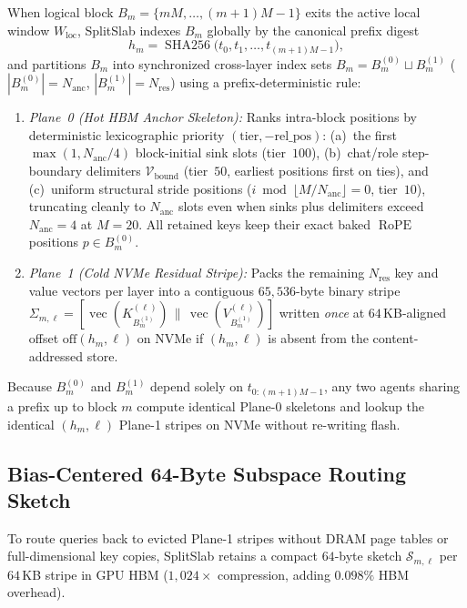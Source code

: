 \documentclass[final,5p,times,twocolumn]{elsarticle}
\theoremstyle{definition}
\theoremstyle{remark}
\newcommand{\SplitSlab}{\textup{\textsc{SplitSlab}}}
\newcommand{\RoPE}{\operatorname{RoPE}}
\def\SplitSlab{SplitSlab}%
\begin{document}
When logical block $B_m = \{mM, \dots, (m+1)M - 1\}$ exits the active local window $W_{\mathrm{loc}}$, \SplitSlab{} indexes $B_m$ globally by the canonical prefix digest
\begin{equation}\label{eq:canon_hash}
h_m = \operatorname{SHA256}\!\big(t_0, t_1, \dots, t_{(m+1)M-1}\big),
\end{equation}
and partitions $B_m$ into synchronized cross-layer index sets $B_m = B_m^{(0)} \sqcup B_m^{(1)}$ ($|B_m^{(0)}| = N_{\mathrm{anc}}$, $|B_m^{(1)}| = N_{\mathrm{res}}$) using a prefix-deterministic rule:
\begin{enumerate}
  \item \emph{Plane~0 (Hot HBM Anchor Skeleton):} Ranks intra-block positions by deterministic lexicographic priority $(\text{tier}, -\text{rel\_pos})$: (a)~the first $\max(1, N_{\mathrm{anc}}/4)$ block-initial sink slots (tier~$100$), (b)~chat/role step-boundary delimiters $\mathcal{V}_{\mathrm{bound}}$ (tier~$50$, earliest positions first on ties), and (c)~uniform structural stride positions ($i \bmod \lfloor M/N_{\mathrm{anc}} \rfloor = 0$, tier~$10$), truncating cleanly to $N_{\mathrm{anc}}$ slots even when sinks plus delimiters exceed $N_{\mathrm{anc}} = 4$ at $M = 20$. All retained keys keep their exact baked $\RoPE$ positions $p \in B_m^{(0)}$.
  \item \emph{Plane~1 (Cold NVMe Residual Stripe):} Packs the remaining $N_{\mathrm{res}}$ key and value vectors per layer into a contiguous $65{,}536$-byte binary stripe $\Sigma_{m,\ell} = [\operatorname{vec}(K_{B_m^{(1)}}^{(\ell)}) \,\|\, \operatorname{vec}(V_{B_m^{(1)}}^{(\ell)})]$ written \emph{once} at $64$\,KB-aligned offset $\mathrm{off}(h_m, \ell)$ on NVMe if $(h_m, \ell)$ is absent from the content-addressed store.
\end{enumerate}

Because $B_m^{(0)}$ and $B_m^{(1)}$ depend solely on $t_{0:(m+1)M-1}$, any two agents sharing a prefix up to block $m$ compute identical Plane-0 skeletons and lookup the identical $(h_m,\ell)$ Plane-1 stripes on NVMe without re-writing flash.

\subsection{Bias-Centered 64-Byte Subspace Routing Sketch}\label{subsec:sketch}

To route queries back to evicted Plane-1 stripes without DRAM page tables or full-dimensional key copies, \SplitSlab{} retains a compact $64$-byte sketch $\mathcal{S}_{m,\ell}$ per $64$\,KB stripe in GPU HBM ($1{,}024\times$ compression, adding $0.098\%$ HBM overhead).
\end{document}
